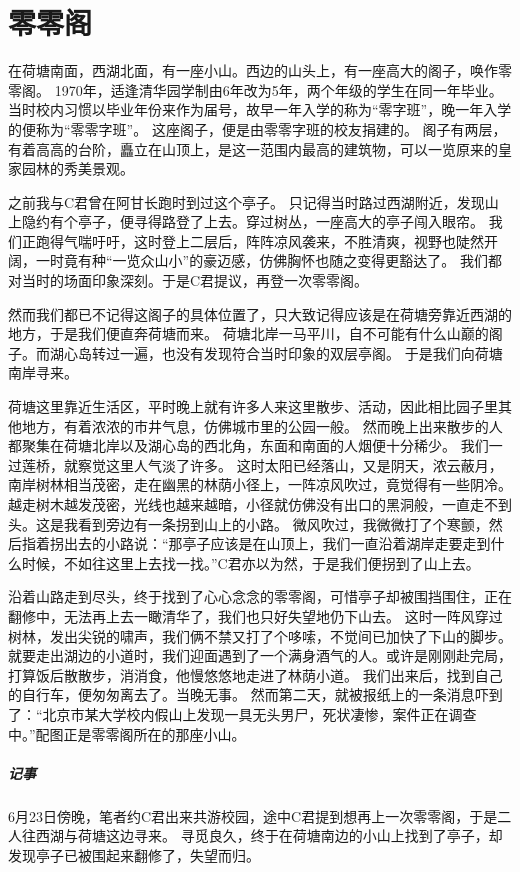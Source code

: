 \chapter{零零阁}

在荷塘南面，西湖北面，有一座小山。西边的山头上，有一座高大的阁子，唤作零零阁。%
1970年，适逢清华园学制由6年改为5年，两个年级的学生在同一年毕业。
当时校内习惯以毕业年份来作为届号，故早一年入学的称为“零字班”，晚一年入学的便称为“零零字班”。
这座阁子，便是由零零字班的校友捐建的。
阁子有两层，有着高高的台阶，矗立在山顶上，是这一范围内最高的建筑物，可以一览原来的皇家园林的秀美景观。

之前我与C君曾在阿甘长跑时到过这个亭子。
只记得当时路过西湖附近，发现山上隐约有个亭子，便寻得路登了上去。穿过树丛，一座高大的亭子闯入眼帘。
我们正跑得气喘吁吁，这时登上二层后，阵阵凉风袭来，不胜清爽，视野也陡然开阔，一时竟有种“一览众山小”的豪迈感，仿佛胸怀也随之变得更豁达了。
我们都对当时的场面印象深刻。于是C君提议，再登一次零零阁。

然而我们都已不记得这阁子的具体位置了，只大致记得应该是在荷塘旁靠近西湖的地方，于是我们便直奔荷塘而来。
荷塘北岸一马平川，自不可能有什么山巅的阁子。而湖心岛转过一遍，也没有发现符合当时印象的双层亭阁。
于是我们向荷塘南岸寻来。

荷塘这里靠近生活区，平时晚上就有许多人来这里散步、活动，因此相比园子里其他地方，有着浓浓的市井气息，仿佛城市里的公园一般。
然而晚上出来散步的人都聚集在荷塘北岸以及湖心岛的西北角，东面和南面的人烟便十分稀少。
我们一过莲桥，就察觉这里人气淡了许多。
这时太阳已经落山，又是阴天，浓云蔽月，南岸树林相当茂密，走在幽黑的林荫小径上，一阵凉风吹过，竟觉得有一些阴冷。
越走树木越发茂密，光线也越来越暗，小径就仿佛没有出口的黑洞般，一直走不到头。这是我看到旁边有一条拐到山上的小路。
微风吹过，我微微打了个寒颤，然后指着拐出去的小路说：“那亭子应该是在山顶上，我们一直沿着湖岸走要走到什么时候，不如往这里上去找一找。”C君亦以为然，于是我们便拐到了山上去。

沿着山路走到尽头，终于找到了心心念念的零零阁，可惜亭子却被围挡围住，正在翻修中，无法再上去一瞰清华了，我们也只好失望地仍下山去。
这时一阵风穿过树林，发出尖锐的啸声，我们俩不禁又打了个哆嗦，不觉间已加快了下山的脚步。
就要走出湖边的小道时，我们迎面遇到了一个满身酒气的人。或许是刚刚赴完局，打算饭后散散步，消消食，他慢悠悠地走进了林荫小道。
我们出来后，找到自己的自行车，便匆匆离去了。当晚无事。
然而第二天，就被报纸上的一条消息吓到了：“北京市某大学校内假山上发现一具无头男尸，死状凄惨，案件正在调查中。”配图正是零零阁所在的那座小山。

\vfill

\paragraph{记事}
6月23日傍晚，笔者约C君出来共游校园，途中C君提到想再上一次零零阁，于是二人往西湖与荷塘这边寻来。
寻觅良久，终于在荷塘南边的小山上找到了亭子，却发现亭子已被围起来翻修了，失望而归。

